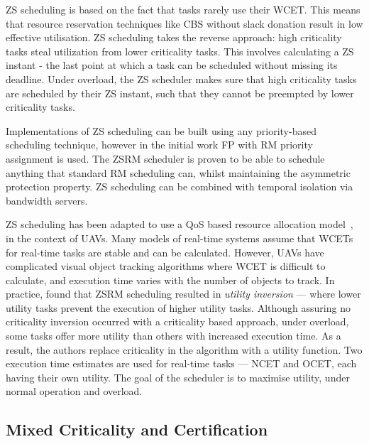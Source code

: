 \gls{ZS} scheduling is based on the fact that tasks rarely use their \gls{WCET}.
This means that resource reservation techniques like \gls{CBS} without slack donation result in low effective utilisation.
ZS scheduling takes the reverse approach: high criticality tasks steal utilization from lower criticality tasks.
This involves calculating a \gls{ZS} instant - the last point at which a task can be scheduled without missing its deadline.
Under overload, the \gls{ZS} scheduler makes sure that high criticality tasks are scheduled by their \gls{ZS} instant, such that they cannot be preempted by lower criticality tasks.

Implementations of \gls{ZS} scheduling can be built using any priority-based scheduling technique, however in the initial work \gls{FP} with \gls{RM} priority assignment is used.
The \gls{ZS}\gls{RM} scheduler is proven to be able to schedule anything that standard \gls{RM} scheduling can, whilst maintaining the asymmetric protection property.
\gls{ZS} scheduling can be combined with temporal isolation via bandwidth servers.

\gls{ZS} scheduling has been adapted to use a \gls{QoS} based resource allocation model~\citep{deNiz_WSRR_2012}, in the context of \glspl{UAV}.
Many models of real-time systems assume that \glspl{WCET} for real-time tasks are stable and can be calculated.
However, \glspl{UAV} have complicated visual object tracking algorithms where \gls{WCET} is difficult to calculate, and execution time varies with the number of objects to track.
In practice,  found that \gls{ZS}\gls{RM} scheduling resulted in \emph{utility inversion} --- where lower utility tasks prevent the execution of higher utility tasks.
Although assuring no criticality inversion occurred with a criticality based approach, under overload, some tasks offer more utility than others with increased execution time.
As a result, the authors replace criticality in the algorithm with a utility function.
Two execution time estimates are used for real-time tasks --- \gls{NCET} and \gls{OCET}, each having their own utility.
The goal of the scheduler is to maximise utility, under normal operation and overload.


\subsection{Mixed Criticality and Certification}
\label{sec:multiple-criticality}


